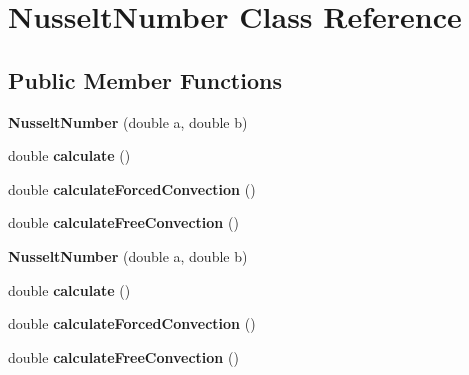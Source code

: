 \hypertarget{class_nusselt_number}{}\section{Nusselt\+Number Class Reference}
\label{class_nusselt_number}
\subsection*{Public Member Functions}
\begin{DoxyCompactItemize}
\item 
\mbox{\label{class_nusselt_number_ab2b7ac674c97dc697a36f5add1377765}} 
{\bfseries Nusselt\+Number} (double a, double b)
\item 
\mbox{\label{class_nusselt_number_a1fd0f2136edae439b1eeaa0f63179316}} 
double {\bfseries calculate} ()
\item 
\mbox{\label{class_nusselt_number_a399ebf734457a199a51d54c992062d96}} 
double {\bfseries calculate\+Forced\+Convection} ()
\item 
\mbox{\label{class_nusselt_number_a5530fb995e97eedd4ca171f8019987d8}} 
double {\bfseries calculate\+Free\+Convection} ()
\item 
\mbox{\label{class_nusselt_number_ab2b7ac674c97dc697a36f5add1377765}} 
{\bfseries Nusselt\+Number} (double a, double b)
\item 
\mbox{\label{class_nusselt_number_a1fd0f2136edae439b1eeaa0f63179316}} 
double {\bfseries calculate} ()
\item 
\mbox{\label{class_nusselt_number_a399ebf734457a199a51d54c992062d96}} 
double {\bfseries calculate\+Forced\+Convection} ()
\item 
\mbox{\label{class_nusselt_number_a5530fb995e97eedd4ca171f8019987d8}} 
double {\bfseries calculate\+Free\+Convection} ()
\item 
\mbox{\label{class_nusselt_number_ab2b7ac674c97dc697a36f5add1377765}} 

\end{DoxyCompactItemize}
